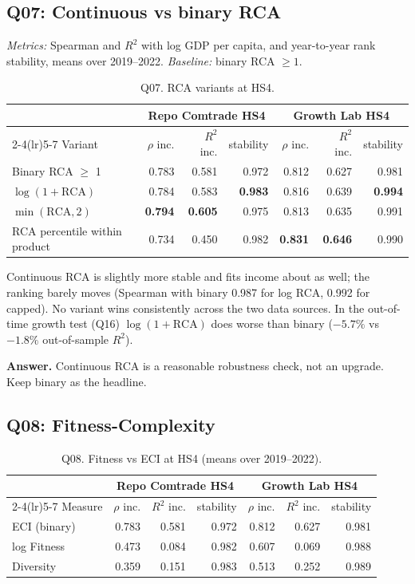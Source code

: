\documentclass[11pt]{article}
\begin{document}
\subsection{Q07: Continuous vs binary RCA}\label{sec:q07}

\emph{Metrics:} Spearman and $R^2$ with log GDP per capita, and year-to-year rank stability, means over 2019--2022. \emph{Baseline:} binary RCA $\ge 1$.

\begin{table}[H]\centering\small
\caption{Q07. RCA variants at HS4.}\label{tab:q07}
\begin{tabular}{lrrrrrr}
\toprule
 & \multicolumn{3}{c}{Repo Comtrade HS4} & \multicolumn{3}{c}{Growth Lab HS4} \\
\cmidrule(lr){2-4}\cmidrule(lr){5-7}
Variant & $\rho$ inc. & $R^2$ inc. & stability & $\rho$ inc. & $R^2$ inc. & stability \\
\midrule
Binary RCA $\ge$ 1 & 0.783 & 0.581 & 0.972 & 0.812 & 0.627 & 0.981 \\
$\log(1+\text{RCA})$ & 0.784 & 0.583 & \textbf{0.983} & 0.816 & 0.639 & \textbf{0.994} \\
$\min(\text{RCA}, 2)$ & \textbf{0.794} & \textbf{0.605} & 0.975 & 0.813 & 0.635 & 0.991 \\
RCA percentile within product & 0.734 & 0.450 & 0.982 & \textbf{0.831} & \textbf{0.646} & 0.990 \\
\bottomrule
\end{tabular}
\end{table}

Continuous RCA is slightly more stable and fits income about as well; the ranking barely moves (Spearman with binary 0.987 for log RCA, 0.992 for capped). No variant wins consistently across the two data sources. In the out-of-time growth test (Q16) $\log(1+\text{RCA})$ does worse than binary ($-5.7\%$ vs $-1.8\%$ out-of-sample $R^2$).

\textbf{Answer.} Continuous RCA is a reasonable robustness check, not an upgrade. Keep binary as the headline.

\subsection{Q08: Fitness-Complexity}\label{sec:q08}

\begin{table}[H]\centering\small
\caption{Q08. Fitness vs ECI at HS4 (means over 2019--2022).}\label{tab:q08}
\begin{tabular}{lrrrrrr}
\toprule
 & \multicolumn{3}{c}{Repo Comtrade HS4} & \multicolumn{3}{c}{Growth Lab HS4} \\
\cmidrule(lr){2-4}\cmidrule(lr){5-7}
Measure & $\rho$ inc. & $R^2$ inc. & stability & $\rho$ inc. & $R^2$ inc. & stability \\
\midrule
ECI (binary) & 0.783 & 0.581 & 0.972 & 0.812 & 0.627 & 0.981 \\
log Fitness & 0.473 & 0.084 & 0.982 & 0.607 & 0.069 & 0.988 \\
Diversity & 0.359 & 0.151 & 0.983 & 0.513 & 0.252 & 0.989 \\
\bottomrule
\end{tabular}
\end{table}
\end{document}
